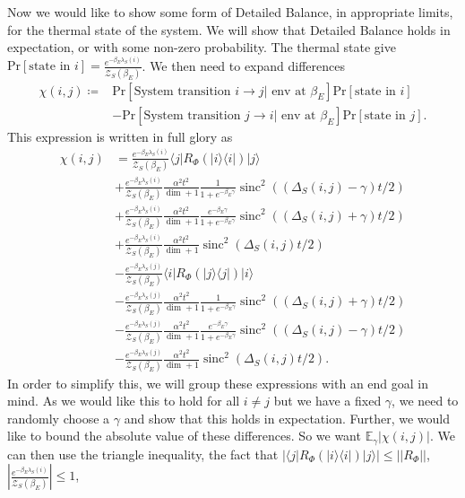 \documentclass{article}
\newcommand{\ket}[1]{|#1\rangle}
\newcommand{\bra}[1]{\langle #1|}
\newcommand{\ketbra}[2]{| #1\rangle\! \langle #2|}
\newcommand{\abs}[1]{\left| #1 \right|}
\newcommand{\norm}[1]{\left| \left| #1 \right| \right|}
\newcommand{\prob}[1]{\text{Pr}\left[ #1 \right]}
\newcommand{\partfun}{\mathcal{Z}}
\DeclareMathOperator{\sinc}{sinc}
\begin{document}
Now we would like to show some form of Detailed Balance, in appropriate limits, for the thermal state of the system. We will show that Detailed Balance holds in expectation, or with some non-zero probability. The thermal state give $\prob{\text{state in } i} = \frac{e^{-\beta_E \lambda_S(i)}}{\partfun_S(\beta_E)}$. We then need to expand differences
\begin{align}
    \chi(i,j) \coloneqq &\prob{\text{System transition } i \to j | \text{ env at } \beta_E} \prob{\text{state in } i} \nonumber \\
    &- \prob{\text{System transition } j \to i | \text{ env at } \beta_E} \prob{\text{state in } j}.
\end{align}
This expression is written in full glory as
\begin{align}
    \chi(i,j) &= \frac{e^{-\beta_E \lambda_S(i)}}{\partfun_S(\beta_E)} \bra{j} R_{\Phi}(\ketbra{i}{i})\ket{j} \nonumber \\
    &+ \frac{e^{-\beta_E \lambda_S(i)}}{\partfun_S(\beta_E)} \frac{\alpha^2 t^2}{\dim + 1} \frac{1}{1 + e^{-\beta_E \gamma}} \sinc^2((\Delta_S(i,j) - \gamma) t/2) \nonumber \\
    &+\frac{e^{-\beta_E \lambda_S(i)}}{\partfun_S(\beta_E)} \frac{\alpha^2 t^2}{\dim + 1} \frac{e^{-\beta_E \gamma}}{1 + e^{-\beta_E \gamma}} \sinc^2((\Delta_S(i,j) + \gamma) t/2) \nonumber \\
    &+ \frac{e^{-\beta_E \lambda_S(i)}}{\partfun_S(\beta_E)} \frac{\alpha^2 t^2}{\dim + 1} \sinc^2(\Delta_S(i,j)t/2) \nonumber \\
    &-\frac{e^{-\beta_E \lambda_S(j)}}{\partfun_S(\beta_E)} \bra{i} R_{\Phi}(\ketbra{j}{j})\ket{i} \nonumber \\
    &- \frac{e^{-\beta_E \lambda_S(j)}}{\partfun_S(\beta_E)} \frac{\alpha^2 t^2}{\dim + 1} \frac{1}{1 + e^{-\beta_E \gamma}} \sinc^2((\Delta_S(i,j) + \gamma) t/2) \nonumber \\
    &-\frac{e^{-\beta_E \lambda_S(j)}}{\partfun_S(\beta_E)} \frac{\alpha^2 t^2}{\dim + 1} \frac{e^{-\beta_E \gamma}}{1 + e^{-\beta_E \gamma}} \sinc^2((\Delta_S(i,j) - \gamma) t/2) \nonumber \\
    &- \frac{e^{-\beta_E \lambda_S(j)}}{\partfun_S(\beta_E)} \frac{\alpha^2 t^2}{\dim + 1} \sinc^2(\Delta_S(i,j)t/2).
\end{align}
In order to simplify this, we will group these expressions with an end goal in mind. As we would like this to hold for all $i \neq j$ but we have a fixed $\gamma$, we need to randomly choose a $\gamma$ and show that this holds in expectation. Further, we would like to bound the absolute value of these differences. So we want $\mathbb{E}_{\gamma}\abs{\chi(i,j)}$. We can then use the triangle inequality, the fact that $\abs{\bra{j}R_{\Phi}(\ketbra{i}{i})\ket{j}} \leq \norm{R_{\Phi}}$, $\abs{\frac{e^{-\beta_E \lambda_S(i)}}{\partfun_S(\beta_E)}} \leq 1$, 
\end{document}
